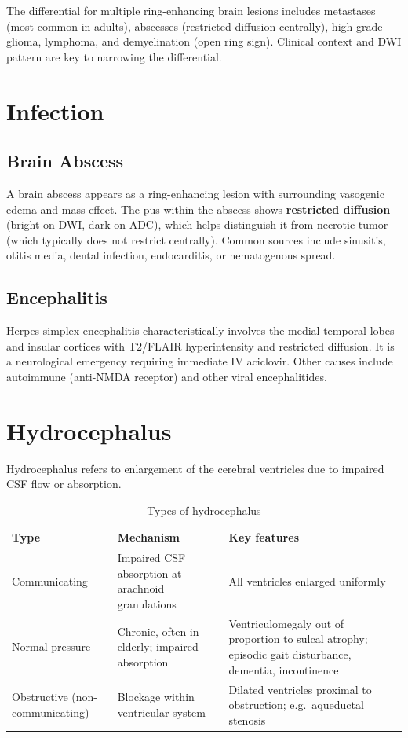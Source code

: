 \begin{pearlbox}
The differential for multiple ring-enhancing brain lesions includes metastases (most common in adults), abscesses (restricted diffusion centrally), high-grade glioma, lymphoma, and demyelination (open ring sign). Clinical context and DWI pattern are key to narrowing the differential.
\end{pearlbox}


\section{Infection}

\subsection{Brain Abscess}
A brain abscess appears as a ring-enhancing lesion with surrounding vasogenic edema and mass effect. The pus within the abscess shows \textbf{restricted diffusion} (bright on DWI, dark on ADC), which helps distinguish it from necrotic tumor (which typically does not restrict centrally). Common sources include sinusitis, otitis media, dental infection, endocarditis, or hematogenous spread.

\subsection{Encephalitis}
Herpes simplex encephalitis characteristically involves the medial temporal lobes and insular cortices with T2/FLAIR hyperintensity and restricted diffusion. It is a neurological emergency requiring immediate IV aciclovir. Other causes include autoimmune (anti-NMDA receptor) and other viral encephalitides.


\section{Hydrocephalus}
Hydrocephalus refers to enlargement of the cerebral ventricles due to impaired CSF flow or absorption.

\begin{table}[h]
\centering
\caption{Types of hydrocephalus}
\begin{tabular}{p{3cm} p{5cm} p{5cm}}
\hline
\textbf{Type} & \textbf{Mechanism} & \textbf{Key features} \\
\hline
Communicating & Impaired CSF absorption at arachnoid granulations & All ventricles enlarged uniformly \\
Normal pressure & Chronic, often in elderly; impaired absorption & Ventriculomegaly out of proportion to sulcal atrophy; episodic gait disturbance, dementia, incontinence \\
Obstructive (non-communicating) & Blockage within ventricular system & Dilated ventricles proximal to obstruction; e.g.\ aqueductal stenosis \\
\hline
\end{tabular}
\end{table}

